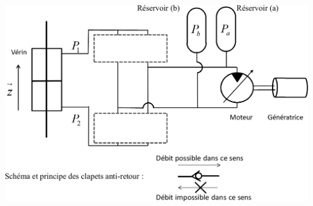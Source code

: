 \documentclass[10pt,fleqn]{article} %
\begin{document}
\begin{multicols}{2}
\begin{center}
\includegraphics[width=\linewidth]{images/fig_10}
\end{center}
\fi
\ifprof
\else
\end{multicols}

\fi
\end{document}
